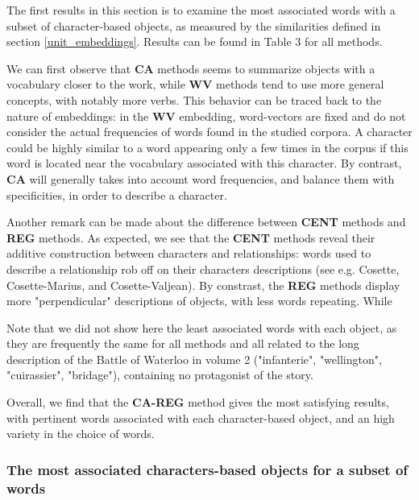\documentclass[
twocolumn,
]{ceurart}
\begin{document}
The first results in this section is to examine the most associated words with a subset of character-based objects, as measured by the similarities defined in section \ref{unit_embeddings}. Results can be found in Table 3 for all methods.

We can first observe that \textbf{CA} methods seems to summarize objects with a vocabulary closer to the work, while \textbf{WV} methods tend to use more general concepts, with notably more verbs. This behavior can be traced back to the nature of embeddings: in the \textbf{WV} embedding, word-vectors are fixed and do not consider the actual frequencies of words found in the studied corpora. A character could be highly similar to a word appearing only a few times in the corpus if this word is located near the vocabulary associated with this character. By contrast, \textbf{CA} will generally takes into account word frequencies, and balance them with specificities, in order to describe a character.

Another remark can be made about the difference between \textbf{CENT} methods and \textbf{REG} methods. As expected, we see that the \textbf{CENT} methods reveal their additive construction between characters and relationships: words used to describe a relationship rob off on their characters descriptions (see e.g. Cosette, Cosette-Marius, and Cosette-Valjean). By constrast, the \textbf{REG} methods display more "perpendicular" descriptions of objects, with less words repeating. While   

Note that we did not show here the least associated words with each object, as they are frequently the same for all methods and all related to the long description of the Battle of Waterloo in volume 2 ("infanterie", "wellington", "cuirassier", "bridage"), containing no protagonist of the story. 

Overall, we find that the \textbf{CA-REG} method gives the most satisfying results, with pertinent words associated with each character-based object, and an high variety in the choice of words. 
	
\subsubsection{The most associated characters-based objects for a subset of words}

\end{document}
